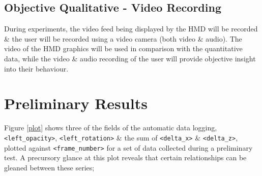 \documentclass[oneside]{book}
\begin{document}

\subsection{Objective Qualitative - Video Recording}
During experiments, the video feed being displayed by the HMD will be recorded \& the user will be recorded using a video camera (both video \& audio). The video of the HMD graphics will be used in comparison with the quantitative data, while the video \& audio recording of the user will provide objective insight into their behaviour.




\section{Preliminary Results}
Figure \ref{plot} shows three of the fields of the automatic data logging, \texttt{<left\_opacity>}, \texttt{<left\_rotation>} \& the sum of \texttt{<delta\_x>} \& \texttt{<delta\_z>}, plotted against \texttt{<frame\_number>} for a set of data collected during a preliminary test. A precursory glance at this plot reveals that certain relationships can be gleaned between these series;
\end{document}
